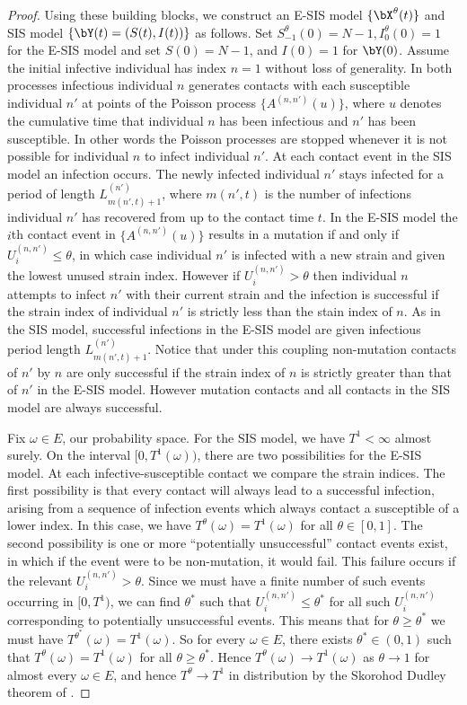 \documentclass[review]{elsarticle}
\begin{document}
\begin{proof}
	Using these building blocks, we construct an E-SIS model $\{\bX^\theta(t)\}$ and SIS model $\{\bY(t) = (S(t), I(t))\}$ as follows. Set $S^\theta_{-1}(0) = N-1, I^\theta_0(0) = 1$ for the E-SIS model and set $S(0) = N-1$, and $I(0) = 1$ for $\bY(0)$. Assume the initial infective individual has index $n=1$ without loss of generality. In both processes infectious individual $n$ generates contacts with each susceptible individual $n'$ at points of the Poisson process $\{A^{(n,n')}(u)\}$, where $u$ denotes the cumulative time that individual $n$ has been infectious and $n'$ has been susceptible. In other words the Poisson processes are stopped whenever it is not possible for individual $n$ to infect individual $n'$. At each contact event in the SIS model an infection occurs. The newly infected individual $n'$ stays infected for a period of length $L^{(n')}_{m(n',t)+1}$, where $m(n',t)$ is the number of infections individual $n'$ has recovered from up to the contact time $t$. In the E-SIS model the $i$th contact event in $\{A^{(n,n')}(u)\}$ results in a mutation if and only if $U^{(n,n')}_i \leq \theta$, in which case individual $n'$ is infected with a new strain and given the lowest unused strain index. However if $U^{(n,n')}_i > \theta$ then individual $n$ attempts to infect $n'$ with their current strain and the infection is successful if the strain index of individual $n'$ is strictly less than the stain index of $n$. As in the SIS model, successful infections in the E-SIS model are given infectious period length $L^{(n')}_{m(n',t)+1}$. Notice that under this coupling non-mutation contacts of $n'$ by $n$ are only successful if the strain index of $n$ is strictly greater than that of $n'$ in the E-SIS model. However mutation contacts and all contacts in the SIS model are always successful.
 
	Fix $\omega \in E$, our probability space. For the SIS model, we have $T^1 < \infty$ almost surely. On the interval $[0, T^1(\omega))$, there are two possibilities for the E-SIS model. At each infective-susceptible contact we compare the strain indices. The first possibility is that every contact will always lead to a successful infection, arising from a sequence of infection events which always contact a susceptible of a lower index. In this case, we have $T^{\theta}(\omega) = T^1(\omega)$ for all $\theta \in [0,1]$. The second possibility is one or more  ``potentially unsuccessful'' contact events exist, in which if the event were to be non-mutation, it would fail. This failure occurs if the relevant $U^{(n,n')}_i > \theta$. Since we must have a finite number of such events occurring in $[0, T^1)$, we can find $\theta^*$ such that $U^{(n,n')}_i \leq \theta^*$ for all such $U^{(n,n')}_i$ corresponding to potentially unsuccessful events. This means that for $\theta\geq \theta^*$ we must have $T^{\theta^*}(\omega) = T^1(\omega)$. So for every $\omega \in E$, there exists $\theta^* \in (0,1)$ such that $T^{\theta}(\omega) = T^1(\omega)$ for all $\theta \geq \theta^*$. Hence $T^{\theta}(\omega) \rightarrow T^1(\omega)$ as $\theta \rightarrow 1$ for almost every $\omega \in E$, and hence $T^\theta\rightarrow T^1$ in distribution by the Skorohod Dudley theorem of \cite{dudley1968}.
\end{proof}
\end{document}
